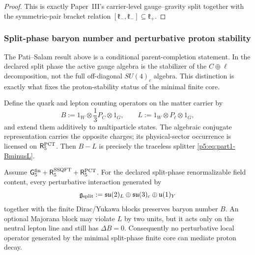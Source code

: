 \documentclass[12pt,a4paper]{article}
\begin{document}
\begin{proof}
This is exactly Paper~III's carrier-level gauge--gravity split together with
the symmetric-pair bracket relation
\([\mathfrak k_-,\mathfrak k_-]\subseteq\mathfrak k_+\).
\end{proof}

\subsubsection{Split-phase baryon number and perturbative proton stability}
\label{p5:sec:split-phase-proton-stability}

The Pati--Salam result above is a conditional parent-completion statement.
In the declared split phase the active gauge algebra is the stabilizer of the
\(C\oplus\ell\) decomposition, not the full off-diagonal \(SU(4)_c\) algebra.
This distinction is exactly what fixes the proton-stability status of the
minimal finite core.

Define the quark and lepton counting operators on the matter carrier by
\begin{equation}
\label{p5:eq:split-phase-BL-counting-operators}
B:=1_W\otimes \frac13 P_C\otimes 1_G,
\qquad
L:=1_W\otimes P_\ell\otimes 1_G,
\end{equation}
and extend them additively to multiparticle states.  The algebraic conjugate
representation carries the opposite charges; its physical-sector occurrence
is licensed on \(\mathsf R_5^{\rm PCT}\).  Then \(B-L\) is precisely the
traceless splitter \eqref{p5:eq:part1-BminusL}.

\begin{theorem}
\label{p5:thm:split-phase-proton-stability}
Assume
\(\mathsf G_5^{\rm fin}
+\mathsf R_5^{\rm SSQFT}+\mathsf R_5^{\rm PCT}\).  For the declared
split-phase renormalizable field
content, every perturbative
interaction generated by
\[
\mathfrak g_{\rm split}
:=\mathfrak{su}(2)_L\oplus\mathfrak{su}(3)_c\oplus\mathfrak u(1)_Y
\]
together with the finite Dirac/Yukawa blocks preserves baryon number \(B\).
An optional Majorana block may violate \(L\) by two units, but it acts only on the
neutral lepton line and still has \(\Delta B=0\).  Consequently no perturbative
local operator generated by the minimal split-phase finite core can mediate proton decay.
\end{theorem}
\end{document}
